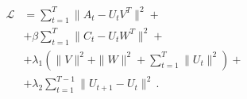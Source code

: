\documentclass{minimal}
\begin{document}
\begin{align*}
    \mathcal{L} &= \sum_{t=1}^T \|A_t - U_t V^T\|^2 + \\
    &+ \beta \sum_{t=1}^T \| C_t -
U_t W^T\|^2 +\\
&+ \lambda_1 \left( \|V\|^2 + \|W\|^2 + \sum_{t=1}^T \|U_t\|^2\right) +\\
&+  \lambda_2 \sum_{t=1}^{T-1} \| U_{t+1} - U_{t}\|^2\,\text{.}
\end{align*}\label{eq:enhanced-model}
\end{document}
